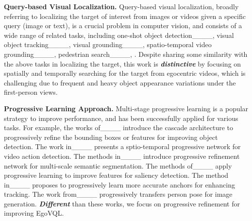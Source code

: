 \vspace{0.5em}
\noindent
\textbf{Query-based Visual Localization.} Query-based visual localization, broadly referring to localizing the target of interest from images or videos given a specific query (image or text), is a crucial problem in computer 
vision, and consists of a wide range of related tasks, including one-shot object detection____, visual object tracking____, visual grounding____, spatio-temporal video grounding____, pedestrian search____, \etc. Despite sharing some similarity with the above tasks in localizing the target, this work is \textbf{\emph{distinctive}} by focusing on spatially and temporally searching for the target from egocentric videos, which is challenging due to frequent and heavy object appearance variations under the first-person views.

\vspace{0.5em}
\noindent
\textbf{Progressive Learning Approach.} Multi-stage progressive learning is a popular strategy to improve performance, and has been successfully applied for various tasks. For example, the works of____ introduce the cascade architecture to progressively refine the bounding boxes or features for improving object detection. The work in____ presents a sptio-temporal progressive network for video action detection. The methods in____ introduce progressive refinement network for multi-scale semantic segmentation. The methods of____ apply progressive learning to improve features for saliency detection. The method in____ proposes to progressively learn more accurate anchors for enhancing tracking. The work from____ progressively transfers person pose for image generation. \textbf{\emph{Different}} than these works, we focus on progressive refinement for improving EgoVQL.